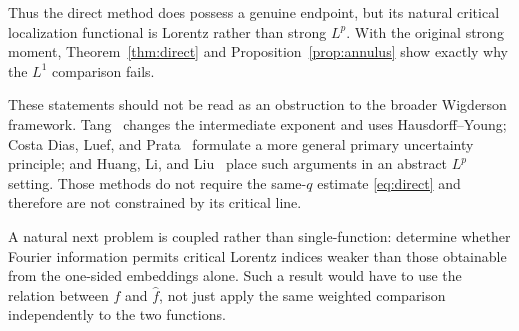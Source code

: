 \documentclass[11pt]{amsart}
\theoremstyle{remark}
\begin{document}
Thus the direct method does possess a genuine endpoint, but its natural
critical localization functional is Lorentz rather than strong $L^p$.
With the original strong moment, Theorem~\ref{thm:direct} and
Proposition~\ref{prop:annulus} show exactly why the $L^1$ comparison fails.

These statements should not be read as an obstruction to the broader
Wigderson framework.  Tang~\cite{Tang25} changes the intermediate exponent
and uses Hausdorff--Young; Costa Dias, Luef, and Prata~\cite{DLP25} formulate
a more general primary uncertainty principle; and Huang, Li, and
Liu~\cite{HLL} place such arguments in an abstract $L^p$ setting.  Those
methods do not require the same-$q$ estimate \eqref{eq:direct} and therefore
are not constrained by its critical line.

A natural next problem is coupled rather than single-function: determine
whether Fourier information permits critical Lorentz indices weaker than
those obtainable from the one-sided embeddings alone.  Such a result would
have to use the relation between $f$ and $\widehat f$, not just apply the
same weighted comparison independently to the two functions.
\end{document}
